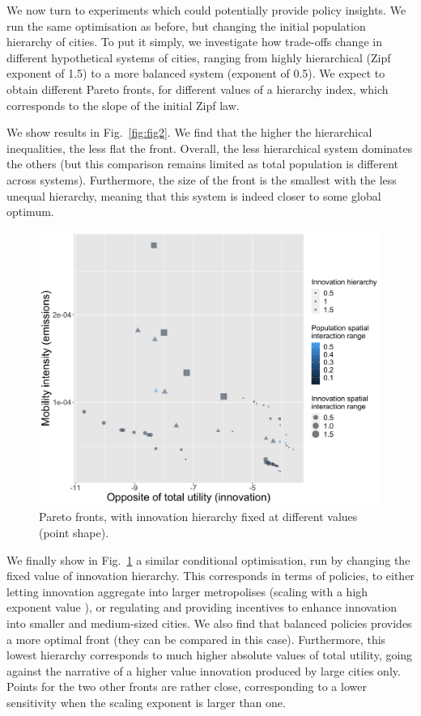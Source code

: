 \documentclass[final,5p,times,twocolumn,authoryear]{elsarticle}
\begin{document}
We now turn to experiments which could potentially provide policy insights. We run the same optimisation as before, but changing the initial population hierarchy of cities. To put it simply, we investigate how trade-offs change in different hypothetical systems of cities, ranging from highly hierarchical (Zipf exponent of 1.5) to a more balanced system (exponent of 0.5). We expect to obtain different Pareto fronts, for different values of a hierarchy index, which corresponds to the slope of the initial Zipf law.

We show results in Fig.~\ref{fig:fig2}. We find that the higher the hierarchical inequalities, the less flat the front. Overall, the less hierarchical system dominates the others (but this comparison remains limited as total population is different across systems). Furthermore, the size of the front is the smallest with the less unequal hierarchy, meaning that this system is indeed closer to some global optimum.




\begin{figure}
	\centering
	\includegraphics[width=\linewidth]{figures/Fig3.png}
	\caption{Pareto fronts, with innovation hierarchy fixed at different values (point shape).\label{fig:fig3}}
\end{figure}

We finally show in Fig.~\ref{fig:fig3} a similar conditional optimisation, run by changing the fixed value of innovation hierarchy. This corresponds in terms of policies, to either letting innovation aggregate into larger metropolises (scaling with a high exponent value \cite{pumain2006evolutionary}), or regulating and providing incentives to enhance innovation into smaller and medium-sized cities. We also find that balanced policies provides a more optimal front (they can be compared in this case). Furthermore, this lowest hierarchy corresponds to much higher absolute values of total utility, going against the narrative of a higher value innovation produced by large cities only. Points for the two other fronts are rather close, corresponding to a lower sensitivity when the scaling exponent is larger than one.
\end{document}
